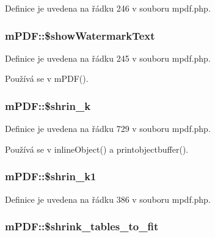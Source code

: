Definice je uvedena na řádku 246 v souboru mpdf.\-php.

\hypertarget{classm_p_d_f_ab657bc01184ea995a19160dc40bfdb10}{
\subsubsection[{\$show\-Watermark\-Text}]{\setlength{\rightskip}{0pt plus 5cm}m\-P\-D\-F\-::\$show\-Watermark\-Text}}\label{classm_p_d_f_ab657bc01184ea995a19160dc40bfdb10}


Definice je uvedena na řádku 245 v souboru mpdf.\-php.



Používá se v m\-P\-D\-F().

\hypertarget{classm_p_d_f_aeb05fd592a8c5a8649c4c65f2523bfdc}{
\subsubsection[{\$shrin\-\_\-k}]{\setlength{\rightskip}{0pt plus 5cm}m\-P\-D\-F\-::\$shrin\-\_\-k}}\label{classm_p_d_f_aeb05fd592a8c5a8649c4c65f2523bfdc}


Definice je uvedena na řádku 729 v souboru mpdf.\-php.



Používá se v inline\-Object() a printobjectbuffer().

\hypertarget{classm_p_d_f_a9fa72f4c4e194fc90de618376487cdbc}{
\subsubsection[{\$shrin\-\_\-k1}]{\setlength{\rightskip}{0pt plus 5cm}m\-P\-D\-F\-::\$shrin\-\_\-k1}}\label{classm_p_d_f_a9fa72f4c4e194fc90de618376487cdbc}


Definice je uvedena na řádku 386 v souboru mpdf.\-php.

\hypertarget{classm_p_d_f_a356132539fd1c9e5c98f7c89b3c5ccbb}{
\subsubsection[{\$shrink\-\_\-tables\-\_\-to\-\_\-fit}]{\setlength{\rightskip}{0pt plus 5cm}m\-P\-D\-F\-::\$shrink\-\_\-tables\-\_\-to\-\_\-fit}}\label{classm_p_d_f_a356132539fd1c9e5c98f7c89b3c5ccbb}


